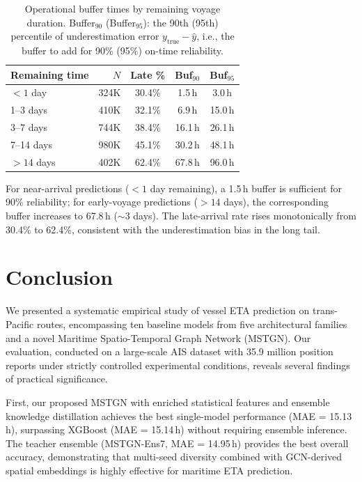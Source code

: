 \documentclass[conference]{IEEEtran}
\begin{document}
\begin{table}[t]
    \centering
    \caption{Operational buffer times by remaining voyage duration. Buffer$_{90}$ (Buffer$_{95}$): the 90th (95th) percentile of underestimation error $y_\text{true} - \hat{y}$, i.e., the buffer to add for 90\% (95\%) on-time reliability.}
    \label{tab:buffer}
    \footnotesize
    \begin{tabular}{lrccc}
        \toprule
        \textbf{Remaining time} & \textbf{$N$} & \textbf{Late \%} & \textbf{Buf$_{90}$} & \textbf{Buf$_{95}$} \\
        \midrule
        $< 1$ day     & 324K  & 30.4\% & 1.5\,h  & 3.0\,h \\
        1--3 days     & 410K  & 32.1\% & 6.9\,h  & 15.0\,h \\
        3--7 days     & 744K  & 38.4\% & 16.1\,h & 26.1\,h \\
        7--14 days    & 980K  & 45.1\% & 30.2\,h & 48.1\,h \\
        $> 14$ days   & 402K  & 62.4\% & 67.8\,h & 96.0\,h \\
        \bottomrule
    \end{tabular}
\end{table}

For near-arrival predictions ($< 1$ day remaining), a 1.5\,h buffer is sufficient for 90\% reliability; for early-voyage predictions ($> 14$ days), the corresponding buffer increases to 67.8\,h ($\sim$3 days). The late-arrival rate rises monotonically from 30.4\% to 62.4\%, consistent with the underestimation bias in the long tail.


\section{Conclusion}

We presented a systematic empirical study of vessel ETA prediction on trans-Pacific routes, encompassing ten baseline models from five architectural families and a novel Maritime Spatio-Temporal Graph Network (MSTGN).
Our evaluation, conducted on a large-scale AIS dataset with 35.9 million position reports under strictly controlled experimental conditions, reveals several findings of practical significance.

First, our proposed MSTGN with enriched statistical features and ensemble knowledge distillation achieves the best single-model performance (MAE = 15.13\,h), surpassing XGBoost (MAE = 15.14\,h) without requiring ensemble inference.
The teacher ensemble (MSTGN-Ens7, MAE = 14.95\,h) provides the best overall accuracy, demonstrating that multi-seed diversity combined with GCN-derived spatial embeddings is highly effective for maritime ETA prediction.
\end{document}

